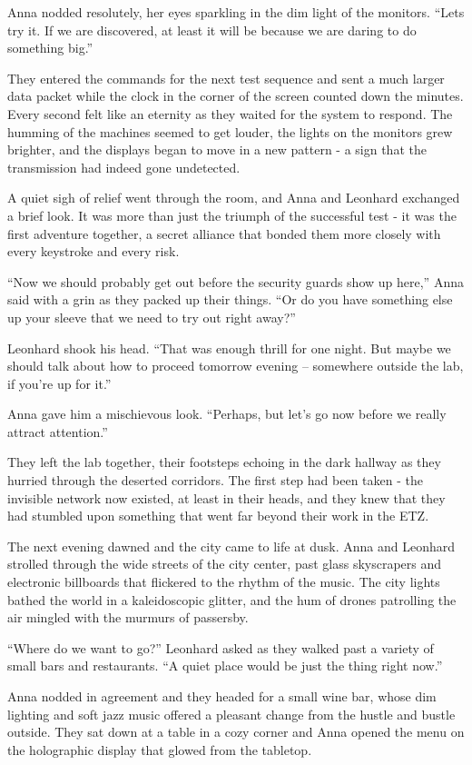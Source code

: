 \documentclass[
]{article}
\begin{document}
Anna nodded resolutely, her eyes sparkling in the dim light of the
monitors. ``Let\textquotesingle s try it. If we are discovered, at least
it will be because we are daring to do something big.''

They entered the commands for the next test sequence and sent a much
larger data packet while the clock in the corner of the screen counted
down the minutes. Every second felt like an eternity as they waited for
the system to respond. The humming of the machines seemed to get louder,
the lights on the monitors grew brighter, and the displays began to move
in a new pattern - a sign that the transmission had indeed gone
undetected.

A quiet sigh of relief went through the room, and Anna and Leonhard
exchanged a brief look. It was more than just the triumph of the
successful test - it was the first adventure together, a secret alliance
that bonded them more closely with every keystroke and every risk.

``Now we should probably get out before the security guards show up
here,'' Anna said with a grin as they packed up their things. ``Or do
you have something else up your sleeve that we need to try out right
away?''

Leonhard shook his head. ``That was enough thrill for one night. But
maybe we should talk about how to proceed tomorrow evening -- somewhere
outside the lab, if you're up for it.''

Anna gave him a mischievous look. ``Perhaps, but let's go now before we
really attract attention.''

They left the lab together, their footsteps echoing in the dark hallway
as they hurried through the deserted corridors. The first step had been
taken - the invisible network now existed, at least in their heads, and
they knew that they had stumbled upon something that went far beyond
their work in the ETZ.

The next evening dawned and the city came to life at dusk. Anna and
Leonhard strolled through the wide streets of the city center, past
glass skyscrapers and electronic billboards that flickered to the rhythm
of the music. The city lights bathed the world in a kaleidoscopic
glitter, and the hum of drones patrolling the air mingled with the
murmurs of passersby.

``Where do we want to go?'' Leonhard asked as they walked past a variety
of small bars and restaurants. ``A quiet place would be just the thing
right now.''

Anna nodded in agreement and they headed for a small wine bar, whose dim
lighting and soft jazz music offered a pleasant change from the hustle
and bustle outside. They sat down at a table in a cozy corner and Anna
opened the menu on the holographic display that glowed from the
tabletop.
\end{document}
